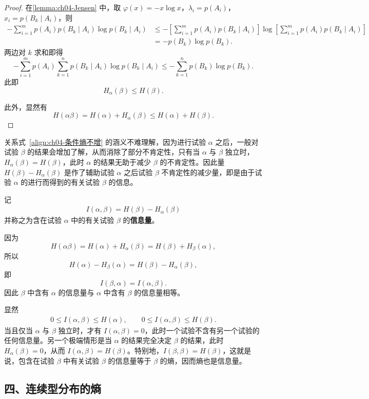 \documentclass[../../main.tex]{subfiles}
\begin{document}
\begin{proof}
在\cref{lemma:ch04-Jensen} 中，取 $\varphi(x)=-x\log x$，$\lambda_i=p(A_i)$，$x_i=p(B_k\mid A_i)$，则
\begin{align*}
-\sum_{i=1}^m p(A_i)p(B_k\mid A_i)\log p(B_k\mid A_i)
&\leqslant-\left[\sum_{i=1}^m p(A_i)p(B_k\mid A_i)\right]\log\left[\sum_{i=1}^m p(A_i)p(B_k\mid A_i)\right]\\
&=-p(B_k)\log p(B_k).
\end{align*}
两边对 $k$ 求和即得
\[
-\sum_{i=1}^m p(A_i)\sum_{k=1}^n p(B_k\mid A_i)\log p(B_k\mid A_i)\leqslant-\sum_{k=1}^n p(B_k)\log p(B_k).
\]
此即
\[
H_\alpha(\beta)\leqslant H(\beta).
\]

此外，显然有
\[
H(\alpha\beta)=H(\alpha)+H_\alpha(\beta)\leqslant H(\alpha)+H(\beta).
\]
\end{proof}

关系式~\eqref{align:ch04-条件熵不增} 的涵义不难理解，因为进行试验 $\alpha$ 之后，一般对试验 $\beta$ 的结果会增加了解，从而消除了部分不肯定性，只有当 $\alpha$ 与 $\beta$ 独立时，$H_\alpha(\beta)=H(\beta)$，此时 $\alpha$ 的结果无助于减少 $\beta$ 的不肯定性。因此量 $H(\beta)-H_\alpha(\beta)$ 是作了辅助试验 $\alpha$ 之后试验 $\beta$ 不肯定性的减少量，即是由于试验 $\alpha$ 的进行而得到的有关试验 $\beta$ 的信息。

记
\begin{align}
I(\alpha,\beta)=H(\beta)-H_\alpha(\beta)\label{align:ch04-互信息}
\end{align}
并称之为含在试验 $\alpha$ 中的有关试验 $\beta$ 的\textbf{信息量}。

因为
\[
H(\alpha\beta)=H(\alpha)+H_\alpha(\beta)=H(\beta)+H_\beta(\alpha),
\]
所以
\[
H(\alpha)-H_\beta(\alpha)=H(\beta)-H_\alpha(\beta),
\]
即
\[
I(\beta,\alpha)=I(\alpha,\beta).
\]
因此 $\beta$ 中含有 $\alpha$ 的信息量与 $\alpha$ 中含有 $\beta$ 的信息量相等。

显然
\begin{align}
0\leqslant I(\alpha,\beta)\leqslant H(\alpha),\qquad 0\leqslant I(\alpha,\beta)\leqslant H(\beta).\label{align:ch04-信息量界}
\end{align}
当且仅当 $\alpha$ 与 $\beta$ 独立时，才有 $I(\alpha,\beta)=0$，此时一个试验不含有另一个试验的任何信息量。另一个极端情形是当 $\alpha$ 的结果完全决定 $\beta$ 的结果，此时 $H_\alpha(\beta)=0$，从而 $I(\alpha,\beta)=H(\beta)$。特别地，$I(\beta,\beta)=H(\beta)$，这就是说，包含在试验 $\beta$ 中有关试验 $\beta$ 的信息量等于 $\beta$ 的熵，因而熵也是信息量。

\subsection*{四、连续型分布的熵}
\end{document}
